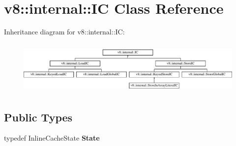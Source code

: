 \hypertarget{classv8_1_1internal_1_1IC}{}\section{v8\+:\+:internal\+:\+:IC Class Reference}
\label{classv8_1_1internal_1_1IC}
Inheritance diagram for v8\+:\+:internal\+:\+:IC\+:\begin{figure}[H]
\begin{center}
\leavevmode
\includegraphics[height=2.692308cm]{classv8_1_1internal_1_1IC}
\end{center}
\end{figure}
\subsection*{Public Types}
\begin{DoxyCompactItemize}
\item 
\mbox{\label{classv8_1_1internal_1_1IC_ad746d8b0ce82eec3a86b4744ca50798a}} 
typedef Inline\+Cache\+State {\bfseries State}
\end{DoxyCompactItemize}
